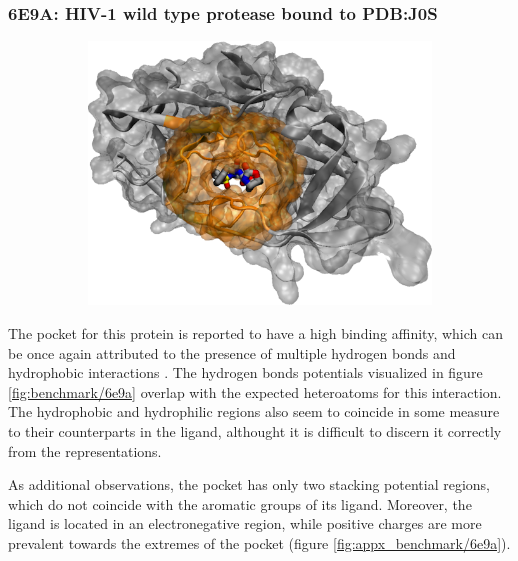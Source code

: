     \subsubsection{6E9A: HIV-1 wild type protease bound to PDB:J0S}
      \begin{figure}[H] \centering
        \begin{subfigure}[c]{0.3\textwidth} \centering
          \includegraphics[width=1\textwidth]{figures/results/ps_prot/6e9a.png}
        \end{subfigure}
        \begin{subfigure}[c]{0.3\textwidth} \centering
        \end{subfigure}
      \end{figure}

      The pocket for this protein is reported to have a high binding affinity, which can be once again attributed to the presence of multiple hydrogen bonds and hydrophobic interactions \cite{benchmark_6e9a_2018}. The hydrogen bonds potentials visualized in figure \ref{fig:benchmark/6e9a} overlap with the expected heteroatoms for this interaction. The hydrophobic and hydrophilic regions also seem to coincide in some measure to their counterparts in the ligand, althought it is difficult to discern it correctly from the representations.

      As additional observations, the pocket has only two stacking potential regions, which do not coincide with the aromatic groups of its ligand. Moreover, the ligand is located in an electronegative region, while positive charges are more prevalent towards the extremes of the pocket (figure \ref{fig:appx_benchmark/6e9a}).

